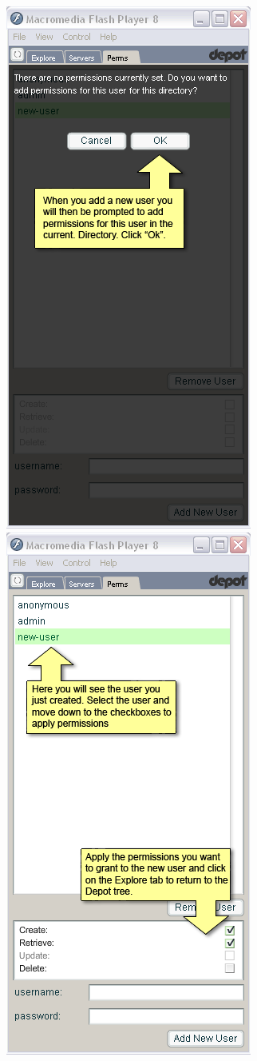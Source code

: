\documentclass{report}
\begin{document}
\begin{center}
\includegraphics[scale=0.5]{users-images/Step12-annotated.png}
\includegraphics[scale=0.5]{users-images/Step13-annotated.png}
\end{center}
\end{document}
